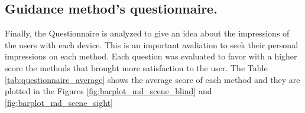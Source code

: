 \subsection{Guidance method's questionnaire.}
\label{subsec:results_questionnaires}

Finally, the Questionnaire is analyzed to give an idea about the impressions of the users with each device. This is an important avaliation to seek their personal impressions on each method. Each question was evaluated to favor with a higher score the methods that brought more satisfaction to the user. The Table \ref{tab:questionnaire_average} shows the average score of each method and they are plotted in the Figures \ref{fig:barplot_md_scene_blind} and \ref{fig:barplot_md_scene_sight}



